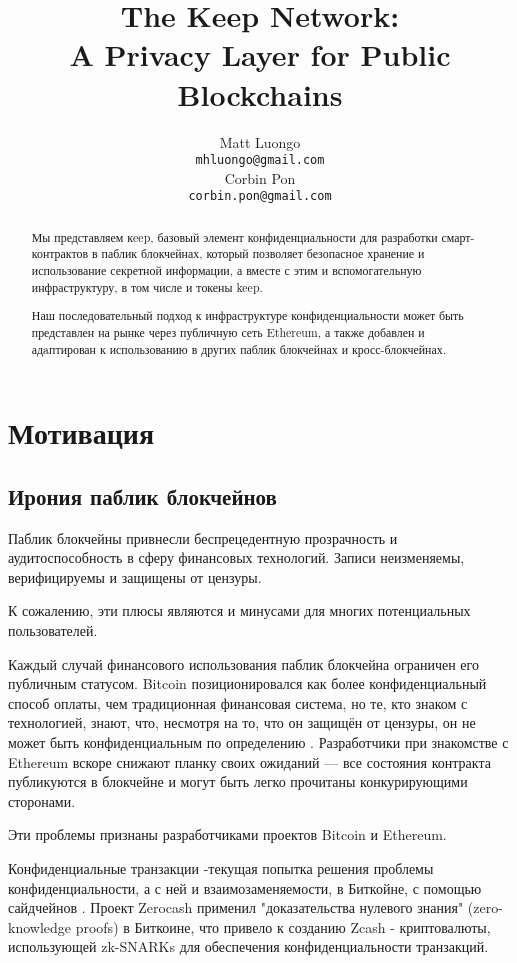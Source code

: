 \documentclass[english,main=russian,11pt]{article}
\title{The Keep Network:\protect\\A Privacy Layer for Public Blockchains}
\author{Matt Luongo \\
  {\tt mhluongo@gmail.com} \\\And
  Corbin Pon \\
  {\tt corbin.pon@gmail.com} \\}
\date{}
\begin{document}
\thispagestyle{fancy}

\maketitle

\begin{abstract}

  Мы представляем кeep, базовый элемент конфиденциальности 
  для разработки смарт-контрактов в паблик блокчейнах, который 
  позволяет безопасное хранение и использование секретной 
  информации, а вместе с этим и вспомогательную  инфраструктуру, 
  в том числе и токены keep.

  Наш последовательный подход к инфраструктуре конфиденциальности 
  может быть представлен на рынке через публичную сеть Ethereum, 
  а также добавлен и адaптирован к использованию в других 
  паблик блокчейнах и кросс-блокчейнах.

\end{abstract}

\section{Мотивация}

\subsection{Ирония паблик блокчейнов}

Паблик блокчейны привнесли беспрецедентную прозрачность и 
аудитоспособность в сферу финансовых технологий. 
Записи неизменяемы, верифицируемы и защищены от цензуры.

К сожалению, эти плюсы являются и минусами для многих потенциальных 
пользователей. 

Каждый  случай финансового использования паблик блокчейна ограничен 
его публичным статусом. Bitcoin позиционировался как более 
конфиденциальный способ оплаты, чем традиционная финансовая система, 
но те, кто знаком с технологией, знают, что, несмотря на то, что 
он защищён от цензуры, он не может быть конфиденциальным по 
определению \cite{bitcoinPrivacy}. Разработчики при знакомстве с 
Ethereum вскоре снижают планку своих ожиданий \cite{ethereumStackexchange}— 
все состояния контракта публикуются в блокчейне и могут быть легко 
прочитаны конкурирующими сторонами.

Эти проблемы признаны разработчиками проектов Bitcoin и Ethereum.

Конфиденциальные транзакции \cite{confidentialTransactions}-текущая 
попытка решения проблемы конфиденциальности, а с ней и 
взаимозаменяемости, в Биткойне, с помощью сайдчейнов \cite{confidentialTransactionsElements}. 
Проект Zerocash \cite{zerocash} применил "доказательства нулевого 
знания" (zero-knowledge proofs) в Биткоине, что привело к созданию 
Zcash \cite{zcash}- криптовалюты, использующей zk-SNARKs для 
обеспечения конфиденциальности транзакций.
\end{document}
